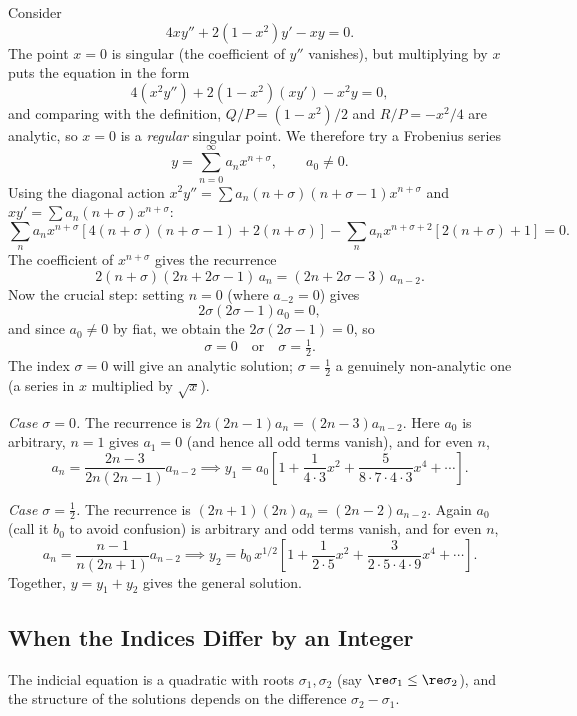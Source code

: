\begin{example}
	Consider
	$$
	4x y'' + 2(1 - x^2) y' - xy = 0.
	$$
	The point $x = 0$ is singular (the coefficient of $y''$ vanishes), but multiplying by $x$ puts the equation in the form
	$$
	4 (x^2 y'') + 2(1 - x^2)(xy') - x^2 y = 0,
	$$
	and comparing with the definition, $Q/P = (1 - x^2)/2$ and $R/P = -x^2/4$ are analytic, so $x = 0$ is a \emph{regular} singular point. We therefore try a Frobenius series
	$$
	y = \sum_{n = 0}^{\infty} a_n x^{n + \sigma}, \qquad a_0 \neq 0.
	$$
	Using the diagonal action $x^2 y'' = \sum a_n (n + \sigma)(n + \sigma - 1) x^{n + \sigma}$ and $xy' = \sum a_n (n + \sigma)x^{n + \sigma}$:
	$$
	\sum_n a_n x^{n + \sigma}\left[4(n + \sigma)(n + \sigma - 1) + 2(n + \sigma)\right] - \sum_n a_n x^{n + \sigma + 2}\left[2(n + \sigma) + 1\right] = 0.
	$$
	The coefficient of $x^{n + \sigma}$ gives the recurrence
	$$
	2(n + \sigma)(2n + 2\sigma - 1) \, a_n = (2n + 2\sigma - 3)\, a_{n - 2}.
	$$
	Now the crucial step: setting $n = 0$ (where $a_{-2} = 0$) gives
	$$
	2\sigma(2\sigma - 1) a_0 = 0,
	$$
	and since $a_0 \neq 0$ by fiat, we obtain the  $2\sigma(2\sigma - 1) = 0$, so
	$$
	\sigma = 0 \quad \text{or} \quad \sigma = \tfrac 12.
	$$
	The index $\sigma = 0$ will give an analytic solution; $\sigma = \frac12$ a genuinely non-analytic one (a series in $x$ multiplied by $\sqrt x$).

	\emph{Case $\sigma = 0$.} The recurrence is $2n(2n - 1) a_n = (2n - 3) a_{n - 2}$. Here $a_0$ is arbitrary, $n = 1$ gives $a_1 = 0$ (and hence all odd terms vanish), and for even $n$,
	$$
	a_n = \frac{2n - 3}{2n(2n-1)} a_{n - 2} \implies y_1 = a_0 \left[1 + \frac{1}{4 \cdot 3}x^2 + \frac{5}{8 \cdot 7 \cdot 4 \cdot 3}x^4 + \cdots\right].
	$$

	\emph{Case $\sigma = \frac12$.} The recurrence is $(2n + 1)(2n) a_n = (2n - 2) a_{n - 2}$. Again $a_0$ (call it $b_0$ to avoid confusion) is arbitrary and odd terms vanish, and for even $n$,
	$$
	a_n = \frac{n - 1}{n(2n + 1)} a_{n - 2} \implies y_2 = b_0 \, x^{1/2}\left[1 + \frac{1}{2 \cdot 5}x^2 + \frac{3}{2 \cdot 5 \cdot 4 \cdot 9}x^4 + \cdots \right].
	$$
	Together, $y = y_1 + y_2$ gives the general solution.
\end{example}

\subsection{When the Indices Differ by an Integer}

The indicial equation is a quadratic with roots $\sigma_1, \sigma_2$ (say $\re \sigma_1 \leq \re \sigma_2$), and the structure of the solutions depends on the difference $\sigma_2 - \sigma_1$.

